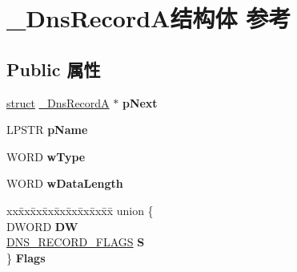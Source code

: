 \hypertarget{struct___dns_record_a}{}\section{\+\_\+\+Dns\+Record\+A结构体 参考}
\label{struct___dns_record_a}
\subsection*{Public 属性}
\begin{DoxyCompactItemize}
\item 
\mbox{\label{struct___dns_record_a_a63d2b90804fed22e8e77385fcca35580}} 
\hyperlink{interfacestruct}{struct} \hyperlink{struct___dns_record_a}{\+\_\+\+Dns\+RecordA} $\ast$ {\bfseries p\+Next}
\item 
\mbox{\label{struct___dns_record_a_aec63fedde2a1a14407fd2c09ad83099d}} 
L\+P\+S\+TR {\bfseries p\+Name}
\item 
\mbox{\label{struct___dns_record_a_a071897d78324db36e9c76dee56625219}} 
W\+O\+RD {\bfseries w\+Type}
\item 
\mbox{\label{struct___dns_record_a_a326d0f689316ba25574c43494b0c2824}} 
W\+O\+RD {\bfseries w\+Data\+Length}
\item 
\mbox{\label{struct___dns_record_a_a813a06c42502b97f3686ad9bd0d56ee2}} 
\begin{tabbing}
xx\=xx\=xx\=xx\=xx\=xx\=xx\=xx\=xx\=\kill
union \{\\
\>DWORD {\bfseries DW}\\
\>\hyperlink{struct___dns_record_flags}{DNS\_RECORD\_FLAGS} {\bfseries S}\\
\} {\bfseries Flags}\\


\end{tabbing}
\end{DoxyCompactItemize}
